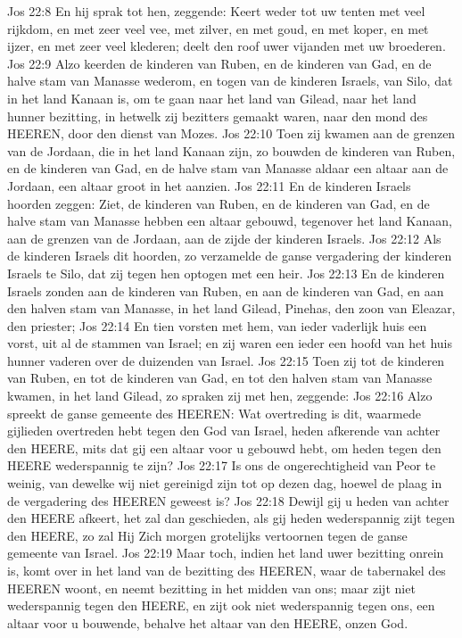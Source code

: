 Jos 22:8  En hij sprak tot hen, zeggende: Keert weder tot uw tenten met veel rijkdom, en met zeer veel vee, met zilver, en met goud, en met koper, en met ijzer, en met zeer veel klederen; deelt den roof uwer vijanden met uw broederen.
Jos 22:9  Alzo keerden de kinderen van Ruben, en de kinderen van Gad, en de halve stam van Manasse wederom, en togen van de kinderen Israels, van Silo, dat in het land Kanaan is, om te gaan naar het land van Gilead, naar het land hunner bezitting, in hetwelk zij bezitters gemaakt waren, naar den mond des HEEREN, door den dienst van Mozes.
Jos 22:10  Toen zij kwamen aan de grenzen van de Jordaan, die in het land Kanaan zijn, zo bouwden de kinderen van Ruben, en de kinderen van Gad, en de halve stam van Manasse aldaar een altaar aan de Jordaan, een altaar groot in het aanzien.
Jos 22:11  En de kinderen Israels hoorden zeggen: Ziet, de kinderen van Ruben, en de kinderen van Gad, en de halve stam van Manasse hebben een altaar gebouwd, tegenover het land Kanaan, aan de grenzen van de Jordaan, aan de zijde der kinderen Israels.
Jos 22:12  Als de kinderen Israels dit hoorden, zo verzamelde de ganse vergadering der kinderen Israels te Silo, dat zij tegen hen optogen met een heir.
Jos 22:13  En de kinderen Israels zonden aan de kinderen van Ruben, en aan de kinderen van Gad, en aan den halven stam van Manasse, in het land Gilead, Pinehas, den zoon van Eleazar, den priester;
Jos 22:14  En tien vorsten met hem, van ieder vaderlijk huis een vorst, uit al de stammen van Israel; en zij waren een ieder een hoofd van het huis hunner vaderen over de duizenden van Israel.
Jos 22:15  Toen zij tot de kinderen van Ruben, en tot de kinderen van Gad, en tot den halven stam van Manasse kwamen, in het land Gilead, zo spraken zij met hen, zeggende:
Jos 22:16  Alzo spreekt de ganse gemeente des HEEREN: Wat overtreding is dit, waarmede gijlieden overtreden hebt tegen den God van Israel, heden afkerende van achter den HEERE, mits dat gij een altaar voor u gebouwd hebt, om heden tegen den HEERE wederspannig te zijn?
Jos 22:17  Is ons de ongerechtigheid van Peor te weinig, van dewelke wij niet gereinigd zijn tot op dezen dag, hoewel de plaag in de vergadering des HEEREN geweest is?
Jos 22:18  Dewijl gij u heden van achter den HEERE afkeert, het zal dan geschieden, als gij heden wederspannig zijt tegen den HEERE, zo zal Hij Zich morgen grotelijks vertoornen tegen de ganse gemeente van Israel.
Jos 22:19  Maar toch, indien het land uwer bezitting onrein is, komt over in het land van de bezitting des HEEREN, waar de tabernakel des HEEREN woont, en neemt bezitting in het midden van ons; maar zijt niet wederspannig tegen den HEERE, en zijt ook niet wederspannig tegen ons, een altaar voor u bouwende, behalve het altaar van den HEERE, onzen God.
